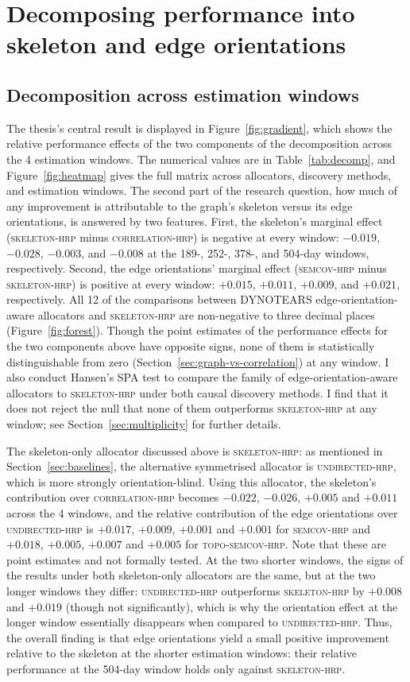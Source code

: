 \documentclass[11pt, a4paper]{report}
\newcommand{\corrhrp}{\textsc{correlation-hrp}}
\newcommand{\skelhrp}{\textsc{skeleton-hrp}}
\newcommand{\undirhrp}{\textsc{undirected-hrp}}
\newcommand{\semcovhrp}{\textsc{semcov-hrp}}
\newcommand{\toposemcovhrp}{\textsc{topo-semcov-hrp}}
\begin{document}
\section{Decomposing performance into skeleton and edge orientations}
\label{sec:decomposition}

\subsection{Decomposition across estimation windows}

The thesis's central result is displayed in Figure~\ref{fig:gradient}, which shows the relative performance effects of the two components of the decomposition across the 4 estimation windows.
The numerical values are in Table~\ref{tab:decomp}, and Figure~\ref{fig:heatmap} gives the
full matrix across allocators, discovery methods, and estimation windows.
The second part of the research question, how much of any improvement is attributable
to the graph's skeleton versus its edge orientations, is answered by two features.
First, the skeleton's marginal effect (\skelhrp{} minus \corrhrp{}) is negative at every window: $-0.019$, $-0.028$, $-0.003$, and $-0.008$ at the 189-, 252-, 378-, and 504-day windows, respectively. 
Second, the edge orientations' marginal effect (\semcovhrp{} minus \skelhrp{}) is
positive at every window: $+0.015$, $+0.011$, $+0.009$, and $+0.021$, respectively. 
All 12 of the comparisons between DYNOTEARS edge-orientation-aware allocators and \skelhrp{} are non-negative to three decimal places (Figure~\ref{fig:forest}).
Though the point estimates of the performance effects for the two components above have opposite signs, none of them is statistically distinguishable from zero (Section~\ref{sec:graph-vs-correlation}) at any window.
I also conduct Hansen's SPA test to compare the family of edge-orientation-aware allocators to \skelhrp{} under both causal discovery methods. I find that it does not reject the null that none of them outperforms \skelhrp{} at any window; see Section~\ref{sec:multiplicity} for further details.

The skeleton-only allocator discussed above is \skelhrp{}: as mentioned in Section~\ref{sec:baselines}, the alternative symmetrised allocator is \undirhrp{}, which is more strongly orientation-blind. Using this allocator, the skeleton's contribution over \corrhrp{} becomes $-0.022$, $-0.026$, $+0.005$ and $+0.011$ across the 4 windows, and the relative contribution of the edge orientations over \undirhrp{} is $+0.017$, $+0.009$, $+0.001$ and $+0.001$ for \semcovhrp{} and $+0.018$, $+0.005$, $+0.007$ and $+0.005$ for \toposemcovhrp{}. Note that these are point estimates and not formally tested. 
At the two shorter windows, the signs of the results under both skeleton-only allocators are the same, but at the two longer windows they differ: \undirhrp{} outperforms
\skelhrp{} by $+0.008$ and $+0.019$ (though not significantly), which is why the orientation effect at the longer window essentially disappears when compared to \undirhrp{}.
Thus, the overall finding is that edge orientations yield a small positive improvement relative to the skeleton at the shorter estimation windows: their relative performance at the 504-day window holds only against \skelhrp{}.
\end{document}
